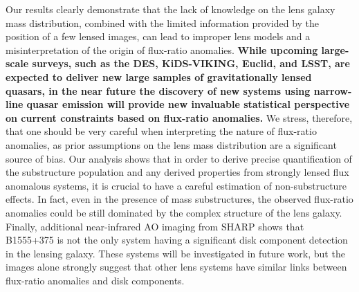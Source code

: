 \documentclass[useAMS,usenatbib]{mn2e}
\begin{document}
Our results clearly
demonstrate that the lack of knowledge on the lens galaxy mass
distribution, combined with the limited information provided by the
position of a few lensed images, can lead to improper lens models and
a misinterpretation of the origin of flux-ratio anomalies. \textbf{While upcoming large-scale surveys, such as the DES, KiDS-VIKING, Euclid, and LSST, are expected to
deliver new large samples of gravitationally lensed quasars, in the
near future the discovery of new systems using narrow-line quasar
emission \citep{N14} will provide new invaluable statistical
perspective on current constraints based on flux-ratio anomalies.} We stress,
therefore, that one should be very careful when interpreting the
nature of flux-ratio anomalies, as prior assumptions on the lens mass
distribution are a significant source of bias. Our analysis shows that
in order to derive precise quantification of the substructure
population and any derived properties from strongly lensed flux
anomalous systems, it is crucial to have a careful estimation of
non-substructure effects. In fact, even in the presence of mass
substructures, the observed flux-ratio anomalies could be still
dominated by the complex structure of the lens galaxy. Finally,
additional near-infrared AO imaging from SHARP shows that B1555+375 is
not the only system having a significant disk component detection in
the lensing galaxy.  These systems will be investigated in future
work, but the images alone strongly suggest that other lens systems
have similar links between flux-ratio anomalies and disk components.
\end{document}
